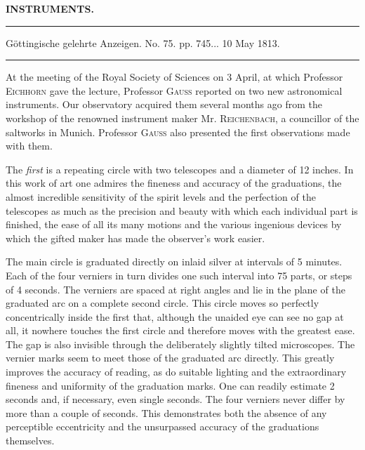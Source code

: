 \clearpage{}\hypertarget{native-370-lower}{}\label{native-370-lower}
\begin{center}\textbf{INSTRUMENTS.}\par\vspace{4pt}\hrule\vspace{4pt}\fontsize{10}{12}\selectfont Göttingische gelehrte Anzeigen. No. 75. pp. 745\;... 10 May 1813.\par\vspace{4pt}\hrule\vspace{4pt}\end{center}

\par\indent At the meeting of the Royal Society of Sciences on 3 April, at which Professor \textsc{Eichhorn} gave the lecture, Professor \textsc{Gauss} reported on two new astronomical instruments. Our observatory acquired them several months ago from the workshop of the renowned instrument maker Mr. \textsc{Reichenbach}, a councillor of the saltworks in Munich. Professor \textsc{Gauss} also presented the first observations made with them.

\par\indent The \emph{first} is a repeating circle with two telescopes and a diameter of 12 inches. In this work of art one admires the fineness and accuracy of the graduations, the almost incredible sensitivity of the spirit levels and the perfection of the telescopes as much as the precision and beauty with which each individual part is finished, the ease of all its many motions and the various ingenious devices by which the gifted maker has made the observer’s work easier.

\par\indent The main circle is graduated directly on inlaid silver at intervals of 5 minutes. Each of the four verniers in turn divides one such interval into 75 parts, or steps of 4 seconds. The verniers are spaced at right angles and lie in the plane of the graduated arc on a complete second circle. This circle moves so perfectly concentrically inside the first that, although the unaided eye can see no gap at all, it nowhere touches the first circle and therefore moves with the greatest ease. The gap is also invisible through the deliberately slightly tilted microscopes. The vernier marks seem to meet those of the graduated arc directly. This greatly improves the accuracy of reading, as do suitable lighting and the extraordinary fineness and uniformity of the graduation marks. One can readily estimate 2 seconds and, if necessary, even single seconds. The four verniers never differ by more than a couple of seconds. This demonstrates both the absence of any perceptible eccentricity and the unsurpassed accuracy of the graduations themselves.


